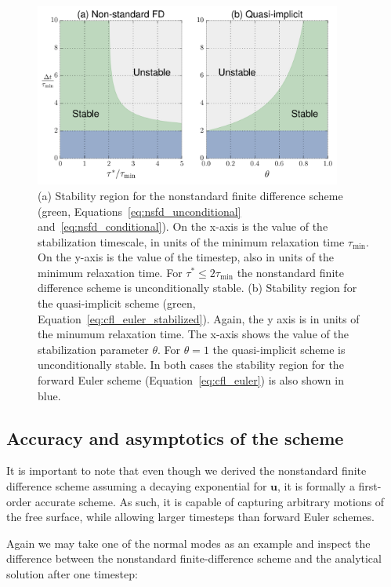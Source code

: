 \documentclass[preprint,12pt,authoryear]{elsarticle}
\begin{document}
\begin{figure}
\includegraphics[width=0.9\textwidth]{figures/stability_region.pdf}
\caption[Stability regions for the nonstandard finite difference and quasi-implicit timestepping schemes.]{(a) Stability region for the nonstandard finite difference scheme (green, Equations~\eqref{eq:nsfd_unconditional} and~\eqref{eq:nsfd_conditional}). On the x-axis is the value of the stabilization timescale, in units of the minimum relaxation time $\tau_{\mathrm{min}}$.  On the y-axis is the value of the timestep, also in units of the minimum relaxation time. For $\tau^*\le 2 \tau_{\mathrm{min}}$ the nonstandard finite difference scheme is unconditionally stable.  (b) Stability region for the quasi-implicit scheme (green, Equation~\eqref{eq:cfl_euler_stabilized}).  Again, the y axis is in units of the minumum relaxation time.  The x-axis shows the value of the stabilization parameter $\theta$. For $\theta = 1$ the quasi-implicit scheme is unconditionally stable. In both cases the stability region for the forward Euler scheme (Equation~\eqref{eq:cfl_euler}) is also shown in blue.}
\label{fig:stability_region}
\end{figure}

\subsection{Accuracy and asymptotics of the scheme}
It is important to note that even though we derived the nonstandard finite difference scheme assuming a decaying exponential
for $\mathbf{u}$, it is formally a first-order accurate scheme. As such, it is capable of capturing arbitrary motions 
of the free surface, while allowing larger timesteps than forward Euler schemes.

Again we may take one of the normal modes as an example and inspect the difference between the nonstandard finite-difference
scheme and the analytical solution after one timestep:
\end{document}
